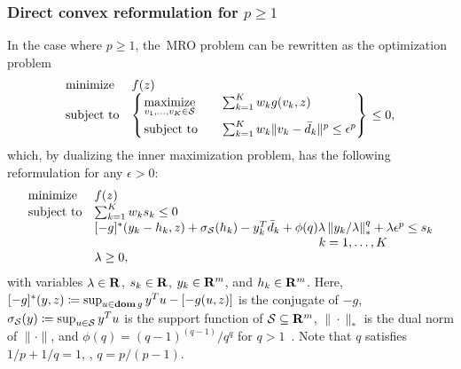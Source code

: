 \subsubsection{Direct convex reformulation for $p \geq 1$}
\label{sub:direct}
In the case where $p \geq 1$, the~\gls{MRO} problem can be rewritten as the optimization problem
\begin{equation}
	\label{eq:unif-const}
	\begin{array}{ll}
		\mbox{minimize} & f(z)\\
		\mbox{subject to} & \begin{dcases}
			\begin{rcases}
		\underset{v_1, \dots, v_K \in \mathcal{S}}{\text{maximize}} &\quad \sum_{k=1} ^K w_k g(v_k, z) \\
		\mbox{subject to} & \quad \sum_{k=1} ^K w_k \| v_k - \bar{d}_k \|^p \le \epsilon^p
			\end{rcases}
			\end{dcases} \le 0,
	\end{array}
\end{equation}
which, by dualizing the inner maximization problem, has the following reformulation for any $\epsilon > 0$:
\begin{equation}
	\label{eq:robustopt_p}
	\begin{array}{ll}
		\mbox{minimize} & f(z)\\
		\mbox{subject to} & \sum_{k=1}^{K} w_k s_k  \le 0\\
		& [-g]^*(y_{k} - h_{k}, z) + \sigma_{{\supp}}(h_{k}) - y_{k}^T\bar{d}_k  + \phi(q)\lambda \left\|y_{k}/\lambda \right\|^q_*  +\lambda \epsilon^p \leq s_k\\
		&\hspace{6cm} \quad k = 1,\dots, K\\
		& \lambda \geq 0,
	\end{array}
\end{equation}
with variables $\lambda \in {\mathbf R}$, $s_k \in {\mathbf R}$, $y_{k} \in {\mathbf R}^{m}$, and $h_{k} \in {\mathbf R}^m$.
Here, $[-g]^*(y, z) \coloneqq \sup_{u\in \mathop{\bf dom} g} y^Tu - [-g(u, z)] $ is the conjugate of $-g$, $\sigma_ {\mathcal{S}}(y) \coloneqq\sup_{u \in  \mathcal{S}}  y^Tu$ is the support function of $ \mathcal{S} \subseteq \mathbf{R}^m$, $\| \cdot \|_*$ is the dual norm of  $\| \cdot \|$, and $\phi(q) = (q-1)^{(q-1)}/q^q$ for $q > 1$~\citep[Theorem 8]{kuhn2019wasserstein}.
Note that $q$ satisfies $1/p + 1/q = 1$, \ie, $q = p/(p - 1)$.
